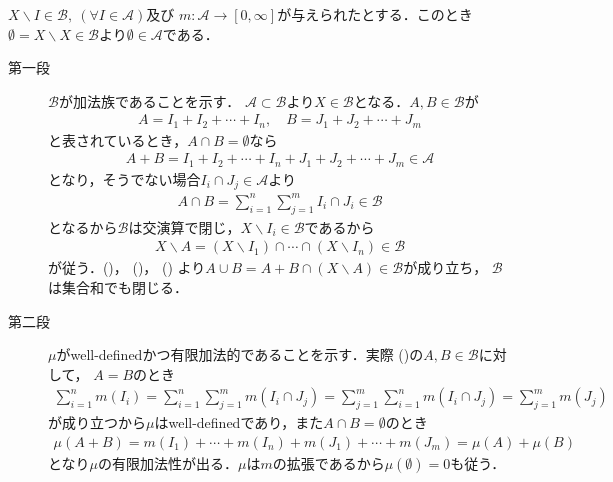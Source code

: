 		\begin{prf} $X \backslash I \in \mathcal{B},\ (\forall I \in \mathcal{A})$及び
			$m:\mathcal{A} \longrightarrow [0,\infty]$が与えられたとする．このとき
			$\emptyset = X \backslash X \in \mathcal{B}$より$\emptyset \in \mathcal{A}$である．
			\begin{description}
				\item[第一段]
					$\mathscr{B}$が加法族であることを示す．
					$\mathcal{A} \subset \mathcal{B}$より$X \in \mathcal{B}$となる．$A,B \in \mathcal{B}$が
					\begin{align}
						A = I_1 + I_2 + \cdots + I_n,
						\quad B = J_1 + J_2 + \cdots + J_m
						\label{eq:thm_forming_finitely_additive_class_4}
					\end{align}
					と表されているとき，$A \cap B = \emptyset$なら
					\begin{align}
						A + B = I_1 + I_2 + \cdots + I_n + J_1 + J_2 + \cdots + J_m \in \mathcal{A}
						\label{eq:thm_forming_finitely_additive_class_1}
					\end{align}
					となり，そうでない場合$I_i \cap J_j \in \mathcal{A}$より
					\begin{align}
						A \cap B = \sum_{i=1}^n\sum_{j=1}^m I_i \cap J_i \in \mathcal{B}
						\label{eq:thm_forming_finitely_additive_class_2}
					\end{align}
					となるから$\mathcal{B}$は交演算で閉じ，$X \backslash I_i \in \mathcal{B}$であるから
					\begin{align}
						X \backslash A = (X \backslash I_1) \cap \cdots \cap (X \backslash I_n) \in \mathcal{B}
						\label{eq:thm_forming_finitely_additive_class_3}
					\end{align}
					が従う．()，
					()，
					()
					より$A \cup B = A + B \cap (X \backslash A) \in \mathcal{B}$が成り立ち，
					$\mathcal{B}$は集合和でも閉じる．
		
				\item[第二段]
					$\mu$がwell-definedかつ有限加法的であることを示す．実際
					()の$A,B \in \mathcal{B}$に対して，
					$A = B$のとき
					\begin{align}
						\sum_{i=1}^n m(I_i)
						= \sum_{i=1}^n \sum_{j=1}^m m(I_i \cap J_j)
						= \sum_{j=1}^m \sum_{i=1}^n m(I_i \cap J_j)
						= \sum_{j=1}^m m(J_j)
					\end{align}
					が成り立つから$\mu$はwell-definedであり，また$A \cap B = \emptyset$のとき
					\begin{align}
						\mu(A + B)
						=  m(I_1) + \cdots + m(I_n) + m(J_1) + \cdots + m(J_m)
						= \mu(A) + \mu(B)
					\end{align}
					となり$\mu$の有限加法性が出る．$\mu$は$m$の拡張であるから$\mu(\emptyset) = 0$も従う．
					\QED
			\end{description}
		\end{prf}
		
